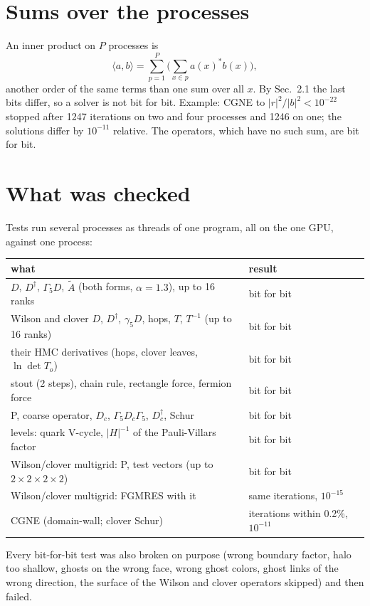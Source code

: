 \documentclass[11pt,a4paper]{article}
\numberwithin{equation}{section}
\newcommand{\dg}{^{\dagger}}
\begin{document}
\section{Sums over the processes}

An inner product on $P$ processes is
\begin{equation}
\langle a,b\rangle = \sum_{p=1}^{P}\Big(\sum_{x\in p} a(x)^* b(x)\Big),
\end{equation}
another order of the same terms than one sum over all $x$. By Sec.~2.1 the last bits differ, so a
solver is not bit for bit. Example: CGNE to $|r|^2/|b|^2<10^{-22}$ stopped after 1247 iterations on
two and four processes and 1246 on one; the solutions differ by $10^{-11}$ relative. The operators,
which have no such sum, are bit for bit.

\section{What was checked}

Tests run several processes as threads of one program, all on the one GPU, against one process:
\begin{center}
\begin{tabular}{ll}
\toprule
what & result \\
\midrule
$D$, $D\dg$, $\Gamma_5D$, $\tilde A$ (both forms, $\alpha=1.3$), up to 16 ranks & bit for bit \\
Wilson and clover $D$, $D\dg$, $\gamma_5D$, hops, $T$, $T^{-1}$ (up to 16 ranks) & bit for bit \\
their HMC derivatives (hops, clover leaves, $\ln\det T_o$) & bit for bit \\
stout (2 steps), chain rule, rectangle force, fermion force & bit for bit \\
P, coarse operator, $D_c$, $\Gamma_5D_c\Gamma_5$, $D_c\dg$, Schur & bit for bit \\
levels: quark V-cycle, $|H|^{-1}$ of the Pauli-Villars factor & bit for bit \\
Wilson/clover multigrid: P, test vectors (up to $2\times2\times2\times2$) & bit for bit \\
Wilson/clover multigrid: FGMRES with it & same iterations, $10^{-15}$ \\
CGNE (domain-wall; clover Schur) & iterations within 0.2\%, $10^{-11}$ \\
\bottomrule
\end{tabular}
\end{center}
Every bit-for-bit test was also broken on purpose (wrong boundary factor, halo too shallow, ghosts
on the wrong face, wrong ghost colors, ghost links of the wrong direction, the surface of the
Wilson and clover operators skipped) and then failed.
\end{document}
